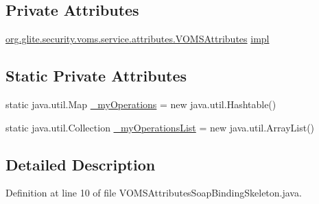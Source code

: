 \subsection*{Private Attributes}
\begin{DoxyCompactItemize}
\item 
\hyperlink{interfaceorg_1_1glite_1_1security_1_1voms_1_1service_1_1attributes_1_1VOMSAttributes}{org.glite.security.voms.service.attributes.VOMSAttributes} \hyperlink{classorg_1_1glite_1_1security_1_1voms_1_1service_1_1attributes_1_1VOMSAttributesSoapBindingSkeleton_a21e3c265df9eb028b0565ed1ed449a85}{impl}
\end{DoxyCompactItemize}
\subsection*{Static Private Attributes}
\begin{DoxyCompactItemize}
\item 
static java.util.Map \hyperlink{classorg_1_1glite_1_1security_1_1voms_1_1service_1_1attributes_1_1VOMSAttributesSoapBindingSkeleton_ac28e4ef27165a9283f9e3b07fdbab7af}{\_\-myOperations} = new java.util.Hashtable()
\item 
static java.util.Collection \hyperlink{classorg_1_1glite_1_1security_1_1voms_1_1service_1_1attributes_1_1VOMSAttributesSoapBindingSkeleton_a73e65e04742c0895b1b0e8957c98675d}{\_\-myOperationsList} = new java.util.ArrayList()
\end{DoxyCompactItemize}


\subsection{Detailed Description}


Definition at line 10 of file VOMSAttributesSoapBindingSkeleton.java.



